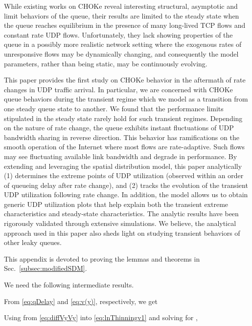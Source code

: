 \documentclass{IEEEtran}
\begin{document}
     While existing works on CHOKe reveal interesting structural, asymptotic and limit behaviors of the queue, their results are limited to the steady state when the queue reaches equilibrium in the presence of many long-lived TCP flows and constant rate UDP flows. Unfortunately, they lack showing properties of the queue in a possibly more realistic network setting where the exogenous rates of unresponsive flows may be dynamically changing, and consequently the model parameters, rather than being static, may be continuously evolving.

     This paper provides the first study on CHOKe behavior in the aftermath of rate changes in UDP traffic arrival. In particular, we are concerned with CHOKe queue behaviors during the transient regime which we model as a transition from one steady queue state to another. We found that the performance limits stipulated in the steady state rarely hold for such transient regimes. Depending on the nature of rate change, the queue exhibits instant fluctuations of UDP bandwidth sharing in reverse direction. This behavior has ramifications on the smooth operation of the Internet where most flows are rate-adaptive. Such flows may see fluctuating available link bandwidth and degrade in performance. By extending and leveraging the spatial distribution model, this paper analytically (1)  determines the extreme points of UDP utilization (observed within an order of queueing delay after rate change), and (2) tracks the  evolution of the transient UDP utilization following rate change. In addition, the model allows us to obtain generic UDP utilization plots that help explain both the transient extreme characteristics and steady-state characteristics. The analytic results have been rigorously validated through extensive simulations. We believe, the analytical approach used in this paper also sheds light on studying transient behaviors of other leaky queues.

    


\newpage
    \appendix

     This appendix is devoted to proving the lemmas and theorems in Sec.~\ref{subsec:modifiedSDM}.

     We need the following intermediate results.

     From \eqref{eq:qDelay} and \eqref{eq:v(y)}, respectively, we get
       
     Using  from \eqref{eq:diffVyVy} into \eqref{eq:lnThinningv1} and solving for ,
        
\end{document}
